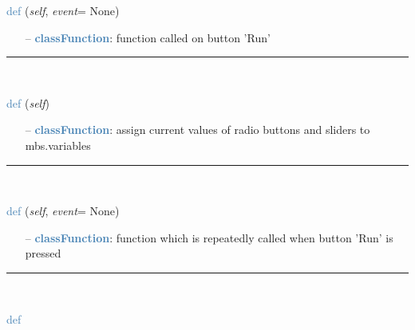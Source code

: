\begin{itemize}[leftmargin=1.4cm]
\begin{itemize}[leftmargin=1.4cm]
\begin{itemize}[leftmargin=0.5cm]
\begin{itemize}[leftmargin=1.4cm]
\begin{itemize}[leftmargin=1.4cm]
\begin{itemize}[leftmargin=0.5cm]
\begin{itemize}[leftmargin=1.4cm]
\begin{itemize}[leftmargin=0.5cm]
\begin{itemize}[leftmargin=1.4cm]
\begin{itemize}[leftmargin=1.4cm]
\begin{flushleft}
\noindent \textcolor{steelblue}{def {\bf {}}}\label{sec:interactive:InteractiveDialog:StartSimulation}
({\it self}, {\it event}= None)
\end{flushleft}
\setlength{\itemindent}{0.7cm}
\begin{itemize}[leftmargin=0.7cm]
  \item[--]  \textcolor{steelblue}{\bf classFunction}: function called on button 'Run'\vspace{12pt}\end{itemize}
%
\noindent\rule{8cm}{0.75pt}\vspace{1pt} \\ 
\begin{flushleft}
\noindent \textcolor{steelblue}{def {\bf {}}}\label{sec:interactive:InteractiveDialog:ProcessWidgetStates}
({\it self})
\end{flushleft}
\setlength{\itemindent}{0.7cm}
\begin{itemize}[leftmargin=0.7cm]
  \item[--]  \textcolor{steelblue}{\bf classFunction}: assign current values of radio buttons and sliders to mbs.variables\vspace{12pt}\end{itemize}
%
\noindent\rule{8cm}{0.75pt}\vspace{1pt} \\ 
\begin{flushleft}
\noindent \textcolor{steelblue}{def {\bf {}}}\label{sec:interactive:InteractiveDialog:ContinuousRunFunction}
({\it self}, {\it event}= None)
\end{flushleft}
\setlength{\itemindent}{0.7cm}
\begin{itemize}[leftmargin=0.7cm]
  \item[--]  \textcolor{steelblue}{\bf classFunction}: function which is repeatedly called when button 'Run' is pressed\vspace{12pt}\end{itemize}
%
\noindent\rule{8cm}{0.75pt}\vspace{1pt} \\ 
\begin{flushleft}
\noindent \textcolor{steelblue}{def {\bf {}}}\label{sec:interactive:InteractiveDialog:InitializePlots}

\end{flushleft}
\end{itemize}
\end{itemize}
\end{itemize}
\end{itemize}
\end{itemize}
\end{itemize}
\end{itemize}
\end{itemize}
\end{itemize}
\end{itemize}
